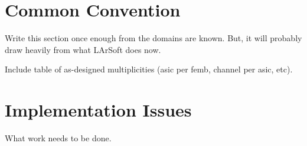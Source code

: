 \documentclass[letterpaper,twoside,onecolumn,report]{memoir}
\begin{document}
\section{Common Convention}
\label{sec:onering}

Write this section once enough from the domains are known.  But, it
will probably draw heavily from what LArSoft does now.

Include table of as-designed multiplicities (asic per femb, channel per asic, etc).

\section{Implementation Issues}
\label{sec:impl}

What work needs to be done.
\end{document}
